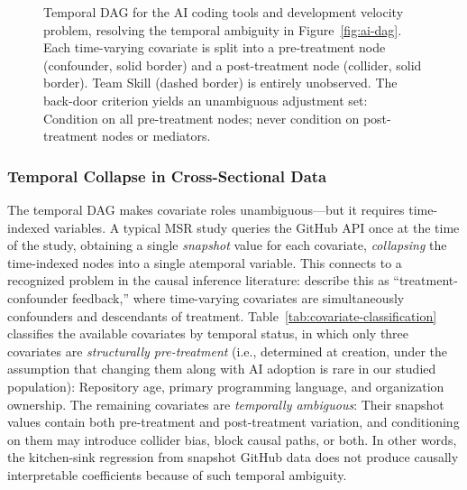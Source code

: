 \begin{figure}[t]
\caption{Temporal DAG for the AI coding tools and development velocity problem, resolving the temporal ambiguity in Figure~\ref{fig:ai-dag}.
Each time-varying covariate is split into a pre-treatment node (confounder, solid border) and a post-treatment node (collider, solid border).
Team Skill (dashed border) is entirely unobserved.
The back-door criterion yields an unambiguous adjustment set: Condition on all pre-treatment nodes; never condition on post-treatment nodes or mediators.}
\label{fig:temporal-dag}
\end{figure}

\subsubsection{Temporal Collapse in Cross-Sectional Data}
\label{sec:temporal-collapse}

The temporal DAG makes covariate roles unambiguous---but it requires time-indexed variables.
A typical MSR study queries the GitHub API once at the time of the study, obtaining a single \emph{snapshot} value for each covariate, \emph{collapsing} the time-indexed nodes into a single atemporal variable.
This connects to a recognized problem in the causal inference literature: \citet[Ch.~20]{hernan2020causal} describe this as ``treatment-confounder feedback,'' where time-varying covariates are simultaneously confounders and descendants of treatment.
Table~\ref{tab:covariate-classification} classifies the available covariates by temporal status, in which only three covariates are \emph{structurally pre-treatment} (i.e., determined at creation, under the assumption that changing them along with AI adoption is rare in our studied population): Repository age, primary programming language, and organization ownership.
The remaining covariates are \emph{temporally ambiguous}: Their snapshot values contain both pre-treatment and post-treatment variation, and conditioning on them may introduce collider bias, block causal paths, or both.
In other words, the kitchen-sink regression from snapshot GitHub data does not produce causally interpretable coefficients because of such temporal ambiguity.

